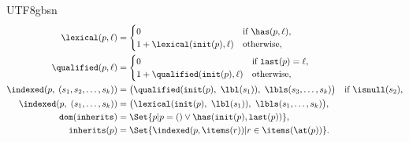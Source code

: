 \begin{CJK*}{UTF8}{gbsn}
\begin{equation}
\begin{aligned}
  \lexical(p, \ell) &=
    \begin{cases}
      0 & \text{if } \has(p, \ell), \\
      1 + \lexical(\init(p), \ell) & \text{otherwise},
    \end{cases} \\
  \qualified(p, \ell) &=
    \begin{cases}
      0 & \text{if } \last(p) = \ell, \\
      1 + \qualified(\init(p), \ell) & \text{otherwise},
    \end{cases} \\
  \indexed(p,\; (s_1, s_2,\ldots,s_k)) &= \bigl(\qualified(\init(p),\ \lbl(s_1)),\ \lbls(s_3,\ldots,s_k)\bigr) \quad \text{if}\ \isnull(s_2), \\
  \indexed(p,\; (s_1,\ldots,s_k)) &= \bigl(\lexical(\init(p),\ \lbl(s_1)),\ \lbls(s_1,\ldots,s_k)\bigr), \\
  \dom(\inherits) &= \Set{ p | p = () \vee \has(\init(p), \last(p)) }, \\
  \inherits(p) &= \Set{ \indexed(p, \items(r)) | r \in \items(\at(p)) }.
\end{aligned}
\end{equation}


\end{CJK*}
